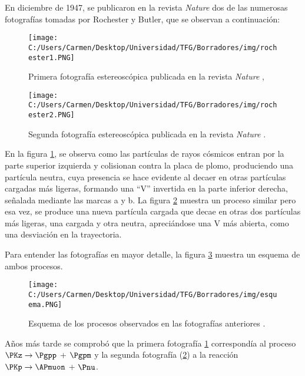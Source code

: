 En diciembre de 1947, se publicaron en la revista \textit{Nature} dos de las numerosas fotografías tomadas por Rochester y Butler, que se observan a continuación:

\begin{figure}[h!]
	\centering
	\texttt{[image: C:/Users/Carmen/Desktop/Universidad/TFG/Borradores/img/rochester1.PNG]}
	\caption[Fotografía 1 de la primera detección de los mesones $\PK$]
	{Primera fotografía estereoscópica publicada en la revista \textit{Nature} \cite{Nature1},}
	\label{fig:nature1}
\end{figure}
\begin{figure}[h!]
	\centering
	\texttt{[image: C:/Users/Carmen/Desktop/Universidad/TFG/Borradores/img/rochester2.PNG]}
	\caption[Fotografía 2 de la primera detección de los mesones $\PK$]
	{Segunda fotografía estereoscópica publicada en la revista \textit{Nature} \cite{Nature1}.}
	\label{fig:nature2}
\end{figure}

En la figura \ref{fig:nature1}, se observa como las partículas de rayos cósmicos entran por la parte superior izquierda y colisionan contra la placa de plomo, produciendo una partícula neutra, cuya presencia se hace evidente al decaer en otras partículas cargadas más ligeras, formando una ``V'' invertida en la parte inferior derecha, señalada mediante las marcas a y b. La figura \ref{fig:nature2} muestra un proceso similar pero esa vez, se produce una nueva partícula cargada que decae en otras dos partículas más ligeras, una cargada y otra neutra, apreciándose una V más abierta, como una desviación en la trayectoria.

Para entender las fotografías en mayor detalle, la figura \ref{fig:esquema1} muestra un esquema de ambos procesos.

\begin{figure}[h!]
	\centering
	\texttt{[image: C:/Users/Carmen/Desktop/Universidad/TFG/Borradores/img/esquema.PNG]}
	\caption[Esquema para entender las fotos estereoscópicas]
	{Esquema de los procesos observados en las fotografías anteriores \cite{Franzini}.}
	\label{fig:esquema1}
\end{figure}

Años más tarde se comprobó que la primera fotografía \ref{fig:nature1} correspondía al proceso  $\PKz \rightarrow \Pgpp$ +  $\Pgpm$ y la segunda fotografía (\ref{fig:nature2}) a la reacción $\PKp \rightarrow \APmuon$ + $\Pnu$.

